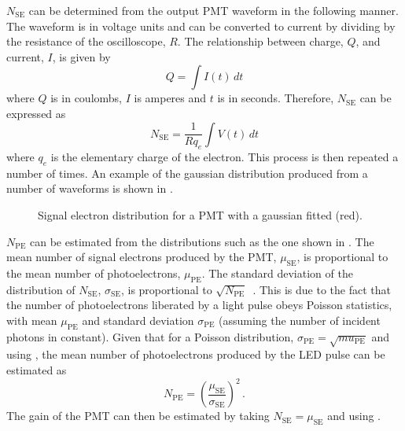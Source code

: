 $N_{\text{SE}}$ can be determined from the output PMT waveform in the following manner.
The waveform is in voltage units and can be converted to current by dividing by the resistance of the oscilloscope, $R$.
The relationship between charge, $Q$, and current, $I$, is given by
\begin{equation}
  Q = \int I(t) \, dt
\end{equation}
where $Q$ is in coulombs, $I$ is amperes and $t$ is in seconds.
Therefore, $N_{\text{SE}}$ can be expressed as
\begin{equation}
  N_{\text{SE}} = \frac{1}{R q_{e}} \int V(t) \, dt
\end{equation}
where $q_{e}$ is the elementary charge of the electron.
This process is then repeated a number of times.
An example of the gaussian distribution produced from a number of waveforms is shown in .

\begin{figure}[h]
  \begin{adjustbox}{max totalsize={.8\textwidth}, center}
    
  \end{adjustbox}
  \caption[Signal electron multiplicity distribution for a PMT.]{Signal electron distribution for a PMT with a gaussian fitted (red).}
  \label{fig:N_se}
\end{figure}

$N_{\text{PE}}$ can be estimated from the distributions such as the one shown in .
The mean number of signal electrons produced by the PMT, $\mu_{\text{SE}}$, is proportional to the mean number of photoelectrons, $\mu_{\text{PE}}$.
The standard deviation of the distribution of $N_{\text{SE}}$, $\sigma_{\text{SE}}$, is proportional to $\sqrt{N_{\text{PE}}}$~\cite{photoelectrons}.
This is due to the fact that the number of photoelectrons liberated by a light pulse obeys Poisson statistics, with mean $\mu_{\text{PE}}$ and standard deviation $\sigma_{\text{PE}}$ (assuming the number of incident photons in constant).
Given that for a Poisson distribution, $\sigma_{\text{PE}} = \sqrt{mu_{\text{PE}}}$ and using , the mean number of photoelectrons produced by the LED pulse can be estimated as
\begin{equation}
  N_{\text{PE}} = \left( \frac{ \mu_{\text{SE}} }{ \sigma_{\text{SE}} }  \right)^{2} \, .
\end{equation}
The gain of the PMT can then be estimated by taking $N_{\text{SE}} = \mu_{\text{SE}}$ and using .


